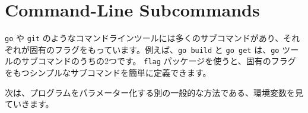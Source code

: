 \section{Command-Line Subcommands}

\texttt{go} や \texttt{git} のようなコマンドラインツールには多くのサブコマンドがあり、それぞれが固有のフラグをもっています。例えば、\texttt{go build} と \texttt{go get} は、\texttt{go} ツールのサブコマンドのうちの2つです。 \texttt{flag} パッケージを使うと、固有のフラグをもつシンプルなサブコマンドを簡単に定義できます。




次は、プログラムをパラメーター化する別の一般的な方法である、環境変数を見ていきます。
